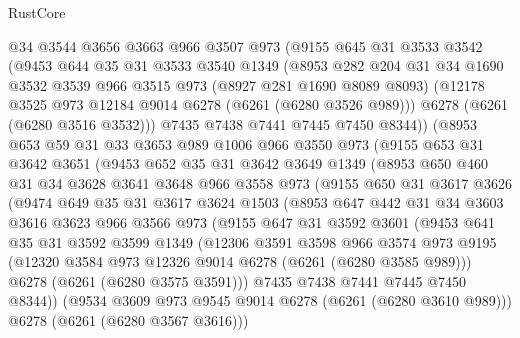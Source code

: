 \begin{lexlean}{RustCore}
\begin{coremodule}
    @34
    @3544
    @3656
    @3663
    @966
    @3507
    @973
    (@9155
      @645
      @31
      @3533
      @3542
      (@9453
        @644
        @35
        @31
        @3533
        @3540
        @1349
        (@8953
          @282
          @204
          @31
          @34
          @1690
          @3532
          @3539
          @966
          @3515
          @973
          (@8927 @281 @1690 @8089 @8093)
          (@12178 @3525 @973 @12184 @9014 @6278 (@6261 (@6280 @3526 @989)))
          @6278
          (@6261 (@6280 @3516 @3532)))
        @7435
        @7438
        @7441
        @7445
        @7450
        @8344))
    (@8953
      @653
      @59
      @31
      @33
      @3653
      @989
      @1006
      @966
      @3550
      @973
      (@9155
        @653
        @31
        @3642
        @3651
        (@9453
          @652
          @35
          @31
          @3642
          @3649
          @1349
          (@8953
            @650
            @460
            @31
            @34
            @3628
            @3641
            @3648
            @966
            @3558
            @973
            (@9155
              @650
              @31
              @3617
              @3626
              (@9474
                @649
                @35
                @31
                @3617
                @3624
                @1503
                (@8953
                  @647
                  @442
                  @31
                  @34
                  @3603
                  @3616
                  @3623
                  @966
                  @3566
                  @973
                  (@9155
                    @647
                    @31
                    @3592
                    @3601
                    (@9453
                      @641
                      @35
                      @31
                      @3592
                      @3599
                      @1349
                      (@12306
                        @3591
                        @3598
                        @966
                        @3574
                        @973
                        @9195
                        (@12320 @3584 @973 @12326 @9014 @6278 (@6261 (@6280 @3585 @989)))
                        @6278
                        (@6261 (@6280 @3575 @3591)))
                      @7435
                      @7438
                      @7441
                      @7445
                      @7450
                      @8344))
                  (@9534 @3609 @973 @9545 @9014 @6278 (@6261 (@6280 @3610 @989)))
                  @6278
                  (@6261 (@6280 @3567 @3616)))

\end{coremodule}
\end{lexlean}
